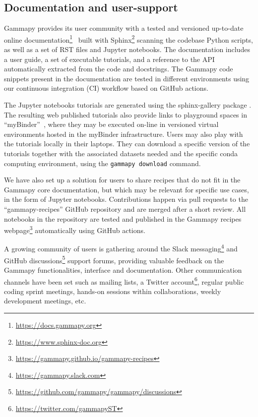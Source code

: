 \documentclass[longauth]{aa}
\newcommand{\code}[1]{\texttt{#1}}
\newcommand{\gammapy}{Gammapy\xspace}
\newcommand{\github}{GitHub\xspace}
\begin{document}
\subsection{Documentation and user-support}
\label{ssec:documentation-and-user-support}
\gammapy provides its user community with a tested and versioned up-to-date
online
documentation\footnote{\url{https://docs.gammapy.org}}~\citep{2019ASPC..523..357B}
built with Sphinx\footnote{\url{https://www.sphinx-doc.org}} scanning the
codebase Python scripts, as well as a set of RST files and Jupyter notebooks.
The documentation includes a user guide, a set of executable
tutorials, and a reference to the API automatically extracted from the code and
docstrings. The \gammapy code snippets present in the documentation are tested
in different environments using our continuous integration (CI) workflow based
on \github actions.

The Jupyter notebooks tutorials are generated using the sphinx-gallery
package \citep{sphinx-gallery}.
The resulting web published tutorials also provide links to playground spaces in
\enquote{myBinder}~\citep{project_jupyter-proc-scipy-2018}, where they may be executed
on-line in versioned virtual environments hosted in the myBinder
infrastructure. Users may also play with the tutorials locally in their
laptops. They can download a specific version of the tutorials together with
the associated datasets needed and the specific conda computing environment,
using the \code{gammapy download} command.

We have also set up a solution for users to share recipes
that do not fit in the \gammapy core documentation, but which may be relevant for
specific use cases, in the form of Jupyter notebooks. Contributions happen via pull requests to the
\enquote{gammapy-recipes} \github repository and are merged after a short review. All
notebooks in the repository are tested and published in the \gammapy recipes
webpage\footnote{\url{https://gammapy.github.io/gammapy-recipes}} automatically
using \github actions.

A growing community of users is gathering around the Slack
messaging\footnote{\url{https://gammapy.slack.com}} and \github
discussions\footnote{\url{https://github.com/gammapy/gammapy/discussions}}
support forums, providing valuable feedback on the \gammapy functionalities,
interface and documentation. Other communication channels have been set such as
mailing lists, a Twitter account\footnote{\url{https://twitter.com/gammapyST}},
regular public coding sprint meetings, hands-on sessions within collaborations,
weekly development meetings, etc.
\end{document}
